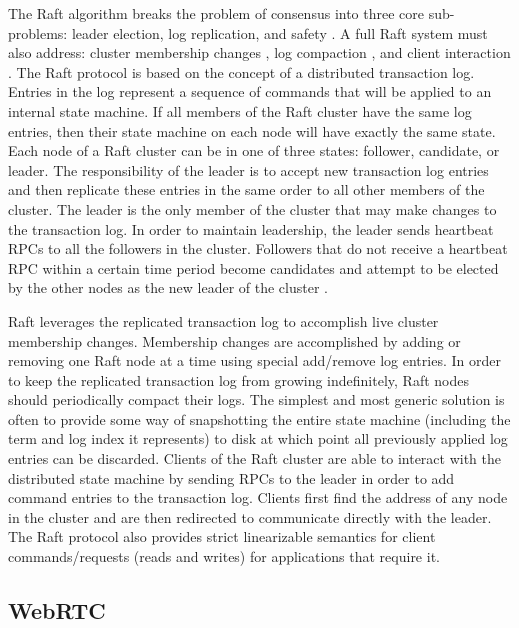 \documentclass[conference,compsoc]{./IEEEtran/IEEEtran}
\begin{document}
The Raft algorithm breaks the problem of consensus into three core sub-problems: leader election, log replication, and safety \cite[Section~3]{raft_thesis:ongaro14}. A full Raft system must also address: cluster membership changes \cite[Section~4]{raft_thesis:ongaro14}, log compaction \cite[Section~5]{raft_thesis:ongaro14}, and client interaction \cite[Section~6]{raft_thesis:ongaro14}. The Raft protocol is based on the concept of a distributed transaction log. Entries in the log represent a sequence of commands that will be applied to an internal state machine. If all members of the Raft cluster have the same log entries, then their state machine on each node will have exactly the same state. Each node of a Raft cluster can be in one of three states: follower, candidate, or leader. The responsibility of the leader is to accept new transaction log entries and then replicate these entries in the same order to all other members of the cluster. The leader is the only member of the cluster that may make changes to the transaction log. In order to maintain leadership, the leader sends heartbeat RPCs to all the followers in the cluster.  Followers that do not receive a heartbeat RPC within a certain time period become candidates and attempt to be elected by the other nodes as the new leader of the cluster \cite[p.~12]{raft_thesis:ongaro14}.

Raft leverages the replicated transaction log to accomplish live cluster membership changes. Membership changes are accomplished by adding or removing one Raft node at a time using special add/remove log entries. In order to keep the replicated transaction log from growing indefinitely, Raft nodes should periodically compact their logs. The simplest and most generic solution is often to provide some way of snapshotting the entire state machine (including the term and log index it represents) to disk at which point all previously applied log entries can be discarded. Clients of the Raft cluster are able to interact with the distributed state machine by sending RPCs to the leader in order to add command entries to the transaction log. Clients first find the address of any node in the cluster and are then redirected to communicate directly with the leader. The Raft protocol also provides strict linearizable semantics for client commands/requests (reads and writes) for applications that require it.

\subsection{WebRTC}
\end{document}
